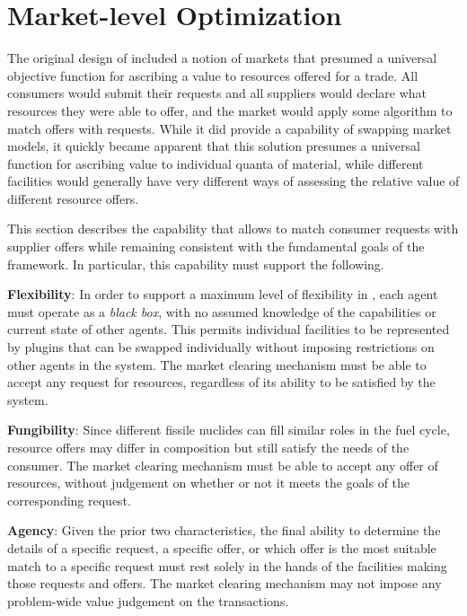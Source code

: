 \section{Market-level Optimization}\label{section:market}

The original design of \Cyclus included a notion of markets that presumed a
universal objective function for ascribing a value to resources offered for a
trade.  All consumers would submit their requests and all suppliers would
declare what resources they were able to offer, and the market would apply
some algorithm to match offers with requests.  While it did provide a
capability of swapping market models, it quickly became apparent that this
solution presumes a universal function for ascribing value to individual
quanta of material, while different facilities would generally have very
different ways of assessing the relative value of different resource offers.

This section describes the capability that allows \Cyclus to match consumer
requests with supplier offers while remaining consistent with the fundamental
goals of the \Cyclus framework.  In particular, this capability must support
the following.

\vspace{1em}
\noindent\textbf{Flexibility}: In order to support a maximum level of
flexibility in \Cyclus, each agent must operate as a \textit{black box}, with
no assumed knowledge of the capabilities or current state of other agents.
This permits individual facilities to be represented by plugins that can be
swapped individually without imposing restrictions on other agents in the
system.  The market clearing mechanism must be able to accept any request for
resources, regardless of its ability to be satisfied by the system.

\vspace{1em}
\noindent\textbf{Fungibility}: Since different fissile nuclides can fill
similar roles in the fuel cycle, resource offers may differ in composition but
still satisfy the needs of the consumer.  The market clearing mechanism must
be able to accept any offer of resources, without judgement on whether or not
it meets the goals of the corresponding request.

\vspace{1em}
\noindent\textbf{Agency}: Given the prior two characteristics, the final
ability to determine the details of a specific request, a specific offer, or
which offer is the most suitable match to a specific request must rest solely
in the hands of the facilities making those requests and offers.  The market
clearing mechanism may not impose any problem-wide value judgement on the
transactions.
\vspace{1em}

